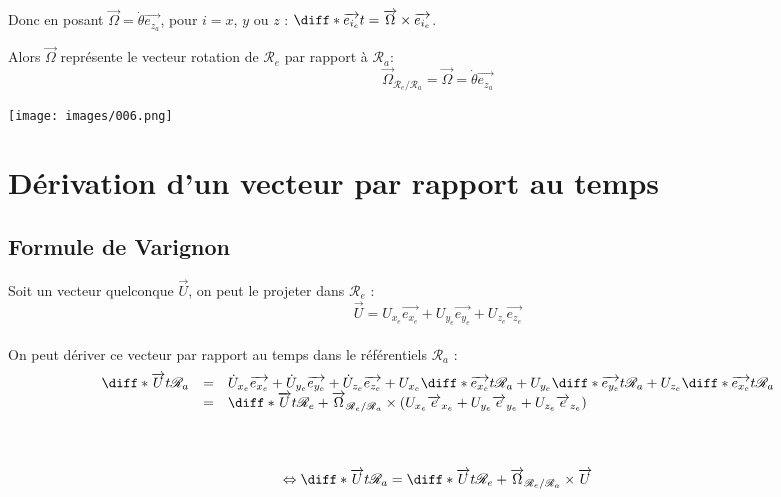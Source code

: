 \documentclass[a4paper,10pt]{book} %
\begin{document}
\bigskip

Donc en posant $\overrightarrow{\Omega}=\dot{\theta}\overrightarrow{e_{z_a}}$, pour $i=x$, $y$ ou $z$ :
$\diff*{\overrightarrow{e_{i_e}}}{t}{}=\overrightarrow{\Omega}\times \overrightarrow{e_{i_e}}$.

\bigskip

Alors $\overrightarrow{\Omega}$ représente le vecteur rotation de $\mathcal{R}_e$ par rapport à $\mathcal{R}_a$:
$$\overrightarrow{\Omega}_{\mathcal{R}_e/\mathcal{R}_a}=\overrightarrow{\Omega}=\dot{\theta}\overrightarrow{e_{z_a}}$$

\bigskip

\begin{center}\texttt{[image: images/006.png]}\end{center}

\newpage

\section{Dérivation d'un vecteur par rapport au temps}
\subsection{Formule de Varignon}
Soit un vecteur quelconque $\overrightarrow{U}$, on peut le projeter dans $\mathcal{R}_e$ : $$\overrightarrow{U}=U_{x_e}\overrightarrow{e_{x_e}}+U_{y_e}\overrightarrow{e_{y_e}}+ U_{z_e}\overrightarrow{e_{z_e}}$$\\
On peut dériver ce vecteur par rapport au temps dans le référentiels $\mathcal{R}_a$ :\\
$$\begin{array}{rcl}\diff*{\overrightarrow{U}}{t}{\mathcal{R}_a}&=&\dot{U}_{x_e}\overrightarrow{e_{x_e}} +\dot{U}_{y_e}\overrightarrow{e_{y_e}} +\dot{U}_{z_e}\overrightarrow{e_{z_e}} +U_{x_e}\diff*{\overrightarrow{e_{x_e}}}{t}{\mathcal{R}_a} +U_{y_e}\diff*{\overrightarrow{e_{y_e}}}{t}{\mathcal{R}_a} +U_{z_e}\diff*{\overrightarrow{e_{x_e}}}{t}{\mathcal{R}_a}\\
&=&\diff*{\overrightarrow{U}}{t}{\mathcal{R}_e}+\overrightarrow{\Omega}_{\mathcal{R}_e/\mathcal{R}_a}\times (U_{x_e}\overrightarrow{e}_{x_e} +U_{y_e}\overrightarrow{e}_{y_e} +U_{z_e}\overrightarrow{e}_{z_e})\end{array}$$\\\\
$$\Leftrightarrow\diff*{\overrightarrow{U}}{t}{\mathcal{R}_a}=\diff*{\overrightarrow{U}}{t}{\mathcal{R}_e}+\overrightarrow{\Omega}_{\mathcal{R}_e/\mathcal{R}_a}\times \overrightarrow{U}$$\\
\end{document}
